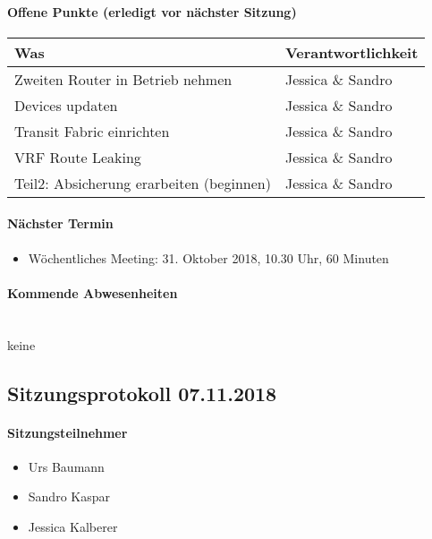 \paragraph{Offene Punkte (erledigt vor nächster Sitzung)} \mbox{}
\begin{table}[H]
	\centering
	\begin{tabularx}{\textwidth}{X | p{4.5cm}}
		\rowcolor{gray!50}
		\textbf{Was} & \textbf{Verantwortlichkeit} \\
		\hline	
		 Zweiten Router in Betrieb nehmen & Jessica \& Sandro \\
		 Devices updaten & Jessica \& Sandro \\
		 Transit Fabric einrichten & Jessica \& Sandro  \\
		 VRF Route Leaking & Jessica \& Sandro \\
		 Teil2: Absicherung erarbeiten (beginnen) & Jessica \& Sandro \\
	\end{tabularx}
	\label{tab:my-label}
\end{table}

\paragraph{Nächster Termin}
\begin{itemize}	
	\item Wöchentliches Meeting: 31. Oktober 2018, 10.30 Uhr, 60 Minuten
\end{itemize}

\paragraph{Kommende Abwesenheiten} \mbox{}\\
keine




\subsection{Sitzungsprotokoll 07.11.2018}

\paragraph{Sitzungsteilnehmer}
\begin{itemize}	
	\item Urs Baumann
	\item Sandro Kaspar
	\item Jessica Kalberer
\end{itemize}


